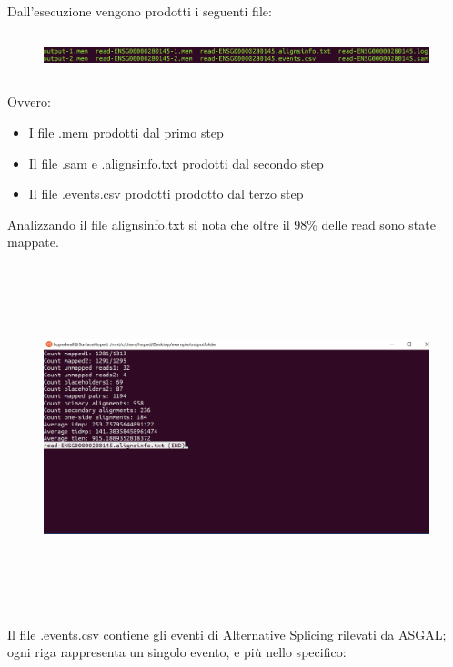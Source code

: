Dall'esecuzione vengono prodotti i seguenti file:

\begin{figure}[h!]
	\centering
	\includegraphics[width=\linewidth,height=1.25cm]{images/fileprodotti.png}
  \label{fig:ProducedFiles}
\end{figure}

Ovvero:

\begin{itemize}
	\item I file .mem prodotti dal primo step
	\item Il file .sam e .alignsinfo.txt prodotti dal secondo step
	\item	Il file .events.csv prodotti prodotto dal terzo step
\end{itemize}

Analizzando il file alignsinfo.txt si nota che oltre il 98\% delle read sono state mappate.

\begin{figure}[h!]
	\centering
	\includegraphics[width=\linewidth,height=10cm]{images/alignsinfotxt.png}
  \label{fig:AlignsInfoExperiment}
\end{figure}

\newpage

Il file .events.csv contiene gli eventi di Alternative Splicing rilevati da ASGAL; ogni riga rappresenta un singolo evento, e più nello specifico:

